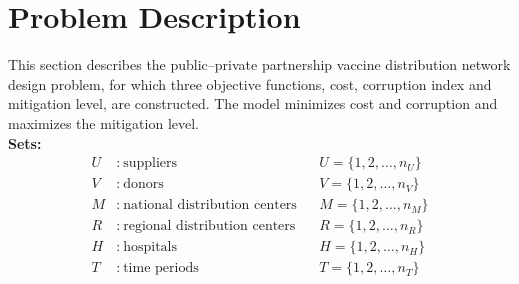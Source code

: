 \documentclass[a4paper]{elsarticle}
\begin{document}
{\section{Problem Description}
\label{s3}
\noindent This section describes the public--private partnership vaccine distribution network design problem, for which three objective functions, cost, corruption index and mitigation level, are constructed. The model minimizes cost and corruption and maximizes the mitigation level.\\
\textbf{Sets:}
\begin{align*}
U &:\ \text{suppliers}   && U = \{1, 2, \dots, n_U\} \\
V &:\ \text{donors}   && V = \{1, 2, \dots, n_V\} \\
M &:\ \text{national distribution centers}   && M = \{1, 2, \dots, n_M\} \\
R &:\ \text{regional distribution centers}   && R = \{1, 2, \dots, n_R\} \\
H &:\ \text{hospitals}   && H = \{1, 2, \dots, n_H\} \\
T &:\ \text{time periods}   && T = \{1, 2, \dots, n_T\}
\end{align*}

}
\end{document}
